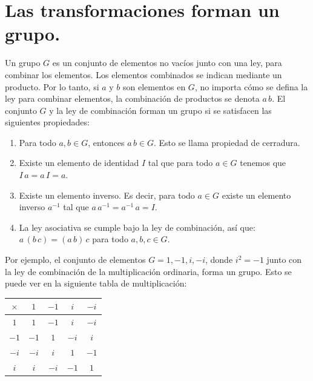 \documentclass[hidelinks,12pt]{article}
\begin{document}
\section{Las transformaciones forman un grupo.}

Un grupo $G$ es un conjunto de elementos no vacíos junto con una ley, para combinar los elementos. Los elementos combinados se indican mediante un producto. Por lo tanto, si $a$ y $b$ son elementos en $G$, no importa cómo se defina la ley para combinar elementos, la combinación de productos se denota $a \, b$. El conjunto $G$ y la ley de combinación forman un grupo si se satisfacen las siguientes propiedades:
\begin{enumerate}[label= (\roman*)]
\item Para todo $a, b \in G$, entonces $a \, b \in G$. Esto se llama propiedad de cerradura.
\item Existe un elemento de identidad $I$ tal que para todo $a \in G$ tenemos que $I \, a = a \, I = a$.
\item Existe un elemento inverso. Es decir, para todo $a \in G$ existe un elemento inverso $a^{-1}$ tal que $a \, a^{-1} = a^{-1} \, a = I$.
\item La ley asociativa se cumple bajo la ley de combinación, así que: $a \, (b \, c) = (a \, b) \,  c$ para todo $a, b, c \in G$.
\end{enumerate}

Por ejemplo, el conjunto de elementos $G = {1, -1, i, -i}$, donde $i^{2} = -1$ junto con la ley de combinación de la multiplicación ordinaria, forma un grupo. Esto se puede ver en la siguiente tabla de multiplicación:
\begin{table}[H]
\centering
\begin{tabular}{| c | c | c | c | c |} \hline
$\times$ & $1$ & $-1$ & $i$ & $-i$ \\ \hline
$1$ & $1$ & $-1$ & $i$ & $-i$ \\ \hline
$-1$ & $-1$ & $1$ & $-i$ & $i$ \\ \hline
$-i$ & $-i$ & $i$ & $1$ & $-1$ \\ \hline
$i$ & $i$ & $-i$ & $-1$ & $1$ \\ \hline
\end{tabular}
\end{table}
\end{document}
